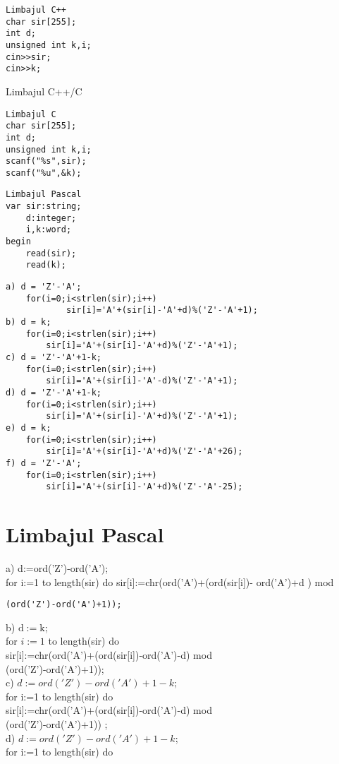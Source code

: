 \begin{verbatim}
Limbajul C++
char sir[255];
int d;
unsigned int k,i;
cin>>sir;
cin>>k;
\end{verbatim}

Limbajul C++/C

\begin{verbatim}
Limbajul C
char sir[255];
int d;
unsigned int k,i;
scanf("%s",sir);
scanf("%u",&k);
\end{verbatim}

\begin{verbatim}
Limbajul Pascal
var sir:string;
    d:integer;
    i,k:word;
begin
    read(sir);
    read(k);
\end{verbatim}

\begin{verbatim}
a) d = 'Z'-'A';
    for(i=0;i<strlen(sir);i++)
            sir[i]='A'+(sir[i]-'A'+d)%('Z'-'A'+1);
b) d = k;
    for(i=0;i<strlen(sir);i++)
        sir[i]='A'+(sir[i]-'A'+d)%('Z'-'A'+1);
c) d = 'Z'-'A'+1-k;
    for(i=0;i<strlen(sir);i++)
        sir[i]='A'+(sir[i]-'A'-d)%('Z'-'A'+1);
d) d = 'Z'-'A'+1-k;
    for(i=0;i<strlen(sir);i++)
        sir[i]='A'+(sir[i]-'A'+d)%('Z'-'A'+1);
e) d = k;
    for(i=0;i<strlen(sir);i++)
        sir[i]='A'+(sir[i]-'A'+d)%('Z'-'A'+26);
f) d = 'Z'-'A';
    for(i=0;i<strlen(sir);i++)
        sir[i]='A'+(sir[i]-'A'+d)%('Z'-'A'-25);
\end{verbatim}

\section*{Limbajul Pascal}
a) d:=ord('Z')-ord('A');\\[0pt]
for i:=1 to length(sir) do sir[i]:=chr(ord('A')+(ord(sir[i])- ord('A')+d ) mod

\begin{verbatim}
(ord('Z')-ord('A')+1));
\end{verbatim}

b) $\mathrm{d}:=\mathrm{k}$;\\
for $i:=1$ to length(sir) do\\[0pt]
sir[i]:=chr(ord('A')+(ord(sir[i])-ord('A')-d) mod\\
(ord('Z')-ord('A')+1));\\
c) $d:=o r d(' Z ')-o r d(' A ')+1-k ;$\\
for i:=1 to length(sir) do\\[0pt]
sir[i]:=chr(ord('A')+(ord(sir[i])-ord('A')-d) mod\\
(ord('Z')-ord('A')+1)) ;\\
d) $d:=o r d(' Z ')-o r d(' A ')+1-k ;$\\
for i:=1 to length(sir) do

